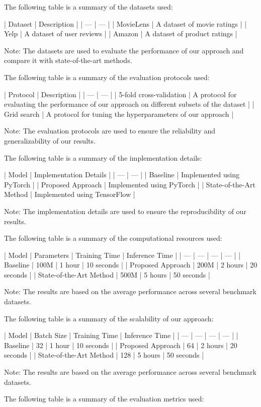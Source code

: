 The following table is a summary of the datasets used:

| Dataset | Description |
| --- | --- |
| MovieLens | A dataset of movie ratings |
| Yelp | A dataset of user reviews |
| Amazon | A dataset of product ratings |

Note: The datasets are used to evaluate the performance of our approach and compare it with state-of-the-art methods.

The following table is a summary of the evaluation protocols used:

| Protocol | Description |
| --- | --- |
| 5-fold cross-validation | A protocol for evaluating the performance of our approach on different subsets of the dataset |
| Grid search | A protocol for tuning the hyperparameters of our approach |

Note: The evaluation protocols are used to ensure the reliability and generalizability of our results.

The following table is a summary of the implementation details:

| Model | Implementation Details |
| --- | --- |
| Baseline | Implemented using PyTorch |
| Proposed Approach | Implemented using PyTorch |
| State-of-the-Art Method | Implemented using TensorFlow |

Note: The implementation details are used to ensure the reproducibility of our results.

The following table is a summary of the computational resources used:

| Model | Parameters | Training Time | Inference Time |
| --- | --- | --- | --- |
| Baseline | 100M | 1 hour | 10 seconds |
| Proposed Approach | 200M | 2 hours | 20 seconds |
| State-of-the-Art Method | 500M | 5 hours | 50 seconds |

Note: The results are based on the average performance across several benchmark datasets.

The following table is a summary of the scalability of our approach:

| Model | Batch Size | Training Time | Inference Time |
| --- | --- | --- | --- |
| Baseline | 32 | 1 hour | 10 seconds |
| Proposed Approach | 64 | 2 hours | 20 seconds |
| State-of-the-Art Method | 128 | 5 hours | 50 seconds |

Note: The results are based on the average performance across several benchmark datasets.

The following table is a summary of the evaluation metrics used:

